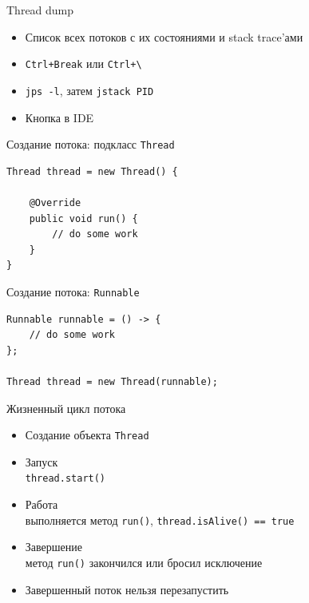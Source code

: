 \documentclass[unicode,mathserif]{beamer}
\begin{document}
\begin{frame}{Thread dump}
\begin{itemize}
\item Список всех потоков с их состояниями и stack trace'ами
    \bigskip

\item \texttt{Ctrl+Break} или \texttt{Ctrl+\textbackslash}
\item \texttt{jps -l}, затем \texttt{jstack PID}
\item Кнопка в IDE
\end{itemize}
\end{frame}


\begin{frame}[fragile]{Создание потока: подкласс \texttt{Thread}}
\begin{lstlisting}
Thread thread = new Thread() {

    @Override
    public void run() {
        // do some work
    }
}
\end{lstlisting}
\end{frame}


\begin{frame}[fragile]{Создание потока: \texttt{Runnable}}
\begin{lstlisting}
Runnable runnable = () -> {
    // do some work
};

Thread thread = new Thread(runnable);
\end{lstlisting}
\end{frame}



\begin{frame}{Жизненный цикл потока}
\begin{itemize}
\item Создание объекта \texttt{Thread}
    \bigskip

\item Запуск\\
    \lstinline|thread.start()|
    \bigskip

\item Работа\\
    выполняется метод \lstinline|run()|,
    \lstinline|thread.isAlive() == true|
    \bigskip

\item Завершение\\
    метод \lstinline|run()| закончился или бросил исключение
    \bigskip

\item Завершенный поток нельзя перезапустить
\end{itemize}
\end{frame}
\end{document}
